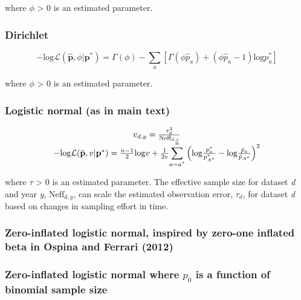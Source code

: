 \documentclass[]{article}
\begin{document}
where \(\phi\) \textgreater{} 0 is an estimated parameter.

\hypertarget{dirichlet}{%
\subsubsection{Dirichlet}\label{dirichlet}}

\[-\mathrm{log}\mathcal{L}(\hat{\mathbf{p}},\phi|\mathbf{p}^{*}) = \Gamma(\phi) - \sum_a \left[ \Gamma (\phi \hat{p}_a ) + (\phi \hat{p}_a-1)\mathrm{log}p^*_a \right]\]

where \(\phi\) \textgreater{} 0 is an estimated parameter.

\hypertarget{logistic-normal-as-in-main-text}{%
\subsubsection{Logistic normal (as in main
text)}\label{logistic-normal-as-in-main-text}}

\begin{equation*}
  \begin{array}{cc}
    v_{d,y} = \frac{\tau^2_d}{\mathrm{Neff_{d,y}}} \\
    -\mathrm{log}\mathcal{L}(\hat{\mathbf{p}},v|\mathbf{p}^{*}) = \frac{n-1}{2}\mathrm{log}v + \frac{1}{2v} \mathlarger{\sum}_{a=a^{*}}^{n} \left(\mathrm{log} \frac{p^{*}_{a}}{p^{*}_{A^{*}}} - \mathrm{log} \frac{\hat{p}_{a}}{\hat{p}_{A^{*}}}\right)^2
  \end{array}
\end{equation*}

where \(\tau\) \textgreater{} 0 is an estimated parameter. The effective
sample size for dataset \emph{d} and year \emph{y},
\(\mathrm{Neff}_{d,y}\), can scale the estimated observation error,
\(\tau_d\), for dataset \emph{d} based on changes in sampling effort in
time.

\hypertarget{zero-inflated-logistic-normal-inspired-by-zero-one-inflated-beta-in-ospina2012general}{%
\subsubsection{Zero-inflated logistic normal, inspired by zero-one
inflated beta in Ospina and Ferrari
(2012)}\label{zero-inflated-logistic-normal-inspired-by-zero-one-inflated-beta-in-ospina2012general}}

\hypertarget{zero-inflated-logistic-normal-where-p_0-is-a-function-of-binomial-sample-size}{%
\subsubsection{\texorpdfstring{Zero-inflated logistic normal where
\(p_0\) is a function of binomial sample
size}{Zero-inflated logistic normal where p\_0 is a function of binomial sample size}}\label{zero-inflated-logistic-normal-where-p_0-is-a-function-of-binomial-sample-size}}
\end{document}
